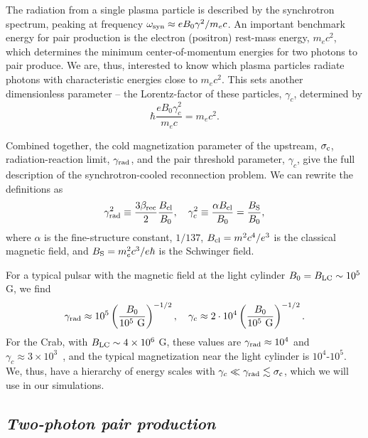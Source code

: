 The radiation from a single plasma particle is described by the synchrotron spectrum, peaking at frequency $\omega_{\rm syn}\approx eB_0\gamma^2 / m_e c$. An important benchmark energy for pair production is the electron (positron) rest-mass energy, $m_e c^2$, which determines the minimum center-of-momentum energies for two photons to pair produce. We are, thus, interested to know which plasma particles radiate photons with characteristic energies close to $m_e c^2$. This sets another dimensionless parameter -- the Lorentz-factor of these particles, $\gamma_c$, determined by
\begin{equation}
    \label{eq:pairprod-def_gammac}
    \hbar \frac{e B_0 \gamma_c^2}{m_e c}= m_e c^2.
\end{equation}

Combined together, the cold magnetization parameter of the upstream, $\sigma_{\rm c}$, radiation-reaction limit, $\gamma_{\rm rad}$, and the pair threshold parameter, $\gamma_c$, give the full description of the synchrotron-cooled reconnection problem. We can rewrite the definitions as
\begin{equation}
\label{eq:pairprod-def_gammas}
    \gamma_{\rm rad}^2 \equiv \frac{3\beta_{\rm rec}}{2}\frac{B_{\rm cl}}{B_0},~~~
    \gamma_c^2 \equiv \frac{\alpha B_{\rm cl}}{B_0} = \frac{B_{\rm S}}{B_0},
\end{equation}
where $\alpha$ is the fine-structure constant, $1/137$, $B_{\rm cl}=m^2 c^4/e^3$ is the classical magnetic field, and $B_{\rm S}=m_e^2 c^3/e\hbar$ is the Schwinger field.

For a typical pulsar with the magnetic field at the light cylinder $B_0 = B_{\rm LC} \sim 10^{5}$ G, we find
\begin{equation}\label{eq:pairprod-rad_c_values}
    \gamma_{\rm rad} \approx 10^5 \left(\frac{B_0}{10^{5}~\textrm{G}}\right)^{-1/2},~~~
    \gamma_c \approx 2\cdot 10^4 \left(\frac{B_0}{10^{5}~\textrm{G}}\right)^{-1/2}.
\end{equation}
For the Crab, with $B_{\rm LC}\sim 4\times 10^6$ G, these values are $\gamma_{\rm rad}\approx 10^4$ and $\gamma_c\approx 3\times 10^3$~\citep{2014ApJ...780....3U}, and the typical magnetization near the light cylinder is $10^4\text{-}10^5$. We, thus, have a hierarchy of energy scales with $\gamma_c \ll \gamma_{\rm rad} \lesssim \sigma_{\rm c}$, which we will use in our simulations.

\subsection*{\small \it Two-photon pair production}

